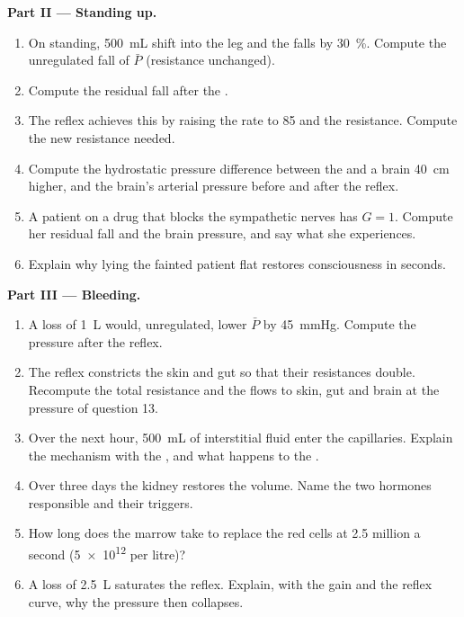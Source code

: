 \begin{problem}
\medskip
\noindent\textbf{Part II --- Standing up.}
\begin{enumerate}[resume]
  \item On standing, \qty{500}{mL} shift into the leg  and the
         falls by \qty{30}{\%}. Compute the unregulated
        fall of $\bar P$ (resistance unchanged).
  \item Compute the residual fall after the .
  \item The reflex achieves this by raising the rate to 85 and the
        resistance. Compute the new resistance needed.
  \item Compute the hydrostatic pressure difference between the 
        and a brain \qty{40}{cm} higher, and the brain's arterial
        pressure before and after the reflex.
  \item A patient on a drug that blocks the sympathetic nerves has
        $G = 1$. Compute her residual fall and the brain pressure,
        and say what she experiences.
  \item Explain why lying the fainted patient flat restores
        consciousness in seconds.
\end{enumerate}

\medskip
\noindent\textbf{Part III --- Bleeding.}
\begin{enumerate}[resume]
  \item A loss of \qty{1}{L} would, unregulated, lower $\bar P$ by
        \qty{45}{mmHg}. Compute the pressure after the reflex.
  \item The reflex constricts the skin and gut  so that
        their resistances double. Recompute the total resistance and
        the flows to skin, gut and brain at the pressure of
        question 13.
  \item Over the next hour, \qty{500}{mL} of interstitial fluid
        enter the capillaries. Explain the mechanism with the
        , and what happens to the .
  \item Over three days the kidney restores the  volume.
        Name the two hormones responsible and their triggers.
  \item How long does the marrow take to replace the red cells at
        \num{2.5} million a second (\num{5e12} per litre)?
  \item A loss of \qty{2.5}{L} saturates the reflex. Explain, with the
        gain and the reflex curve, why the pressure then collapses.
\end{enumerate}


\end{problem}
